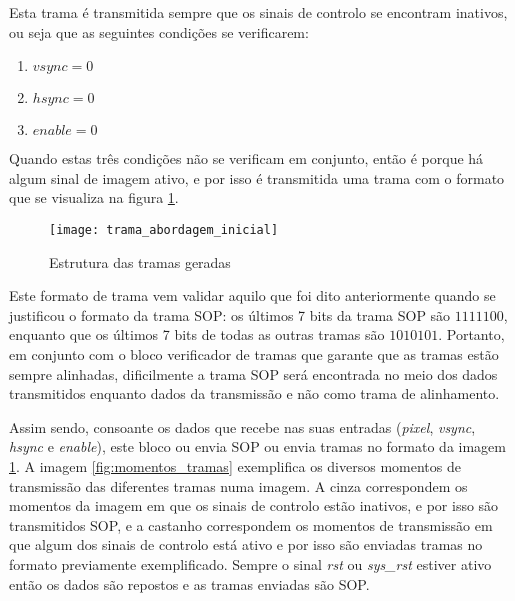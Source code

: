 Esta trama é transmitida sempre que os sinais de controlo se encontram inativos, ou seja que as seguintes condições se verificarem:
\begin{enumerate}
	\item $vsync = 0$
	\item $hsync = 0$
	\item $enable = 0$
\end{enumerate}


Quando estas três condições não se verificam em conjunto, então é porque há algum sinal de imagem ativo, e por isso é transmitida uma trama com o formato que se visualiza na figura \ref{fig:trama_abordagem_inicial}.

\begin{figure}[h!]
	\begin{center}
		\leavevmode
		\texttt{[image: trama\_abordagem\_inicial]}
		\captionsetup{width=1.0\linewidth}
		\caption[Estrutura das tramas geradas]{Estrutura das tramas geradas}
		\label{fig:trama_abordagem_inicial}
	\end{center}
\end{figure}

Este formato de trama vem validar aquilo que foi dito anteriormente quando se justificou o formato da trama SOP: os últimos 7 bits da trama SOP são $1111100$, enquanto que os últimos 7 bits de todas as outras tramas são $1010101$. Portanto, em conjunto com o bloco verificador de tramas que garante que as tramas estão sempre alinhadas, dificilmente a trama SOP será encontrada no meio dos dados transmitidos enquanto dados da transmissão e não como trama de alinhamento.


Assim sendo, consoante os dados que recebe nas suas entradas (\textit{pixel}, \textit{vsync}, \textit{hsync} e \textit{enable}), este bloco ou envia SOP ou envia tramas no formato da imagem \ref{fig:trama_abordagem_inicial}. A imagem \ref{fig:momentos_tramas} exemplifica os diversos momentos de transmissão das diferentes tramas numa imagem. A cinza correspondem os momentos da imagem em que os sinais de controlo estão inativos, e por isso são transmitidos SOP, e a castanho correspondem os momentos de transmissão em que algum dos sinais de controlo está ativo e por isso são enviadas tramas no formato previamente exemplificado. Sempre o sinal \textit{rst} ou \textit{sys\_rst} estiver ativo então os dados são repostos e as tramas enviadas são SOP. 

